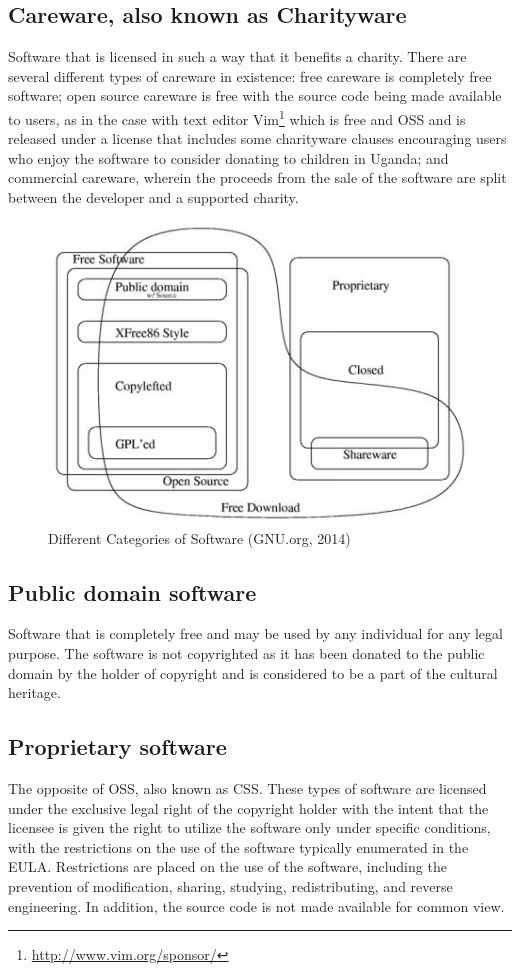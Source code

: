  \subsection*{Careware, also known as Charityware} 
Software that is licensed in such a way that it benefits a charity. There are several different types of careware in existence: free careware is completely free software; open source careware is free with the source code being made available to users, as in the case with text editor Vim\footnote{\url{http://www.vim.org/sponsor/}} which is free and OSS and is released under a license that includes some charityware clauses encouraging users who enjoy the software to consider donating to children in Uganda; and commercial careware, wherein the proceeds from the sale of the software are split between the developer and a supported charity. 
         \begin{figure}[H]
             \includegraphics[scale=0.97]{img/free-open.jpg}
           \caption{Different Categories of Software (GNU.org, 2014)}
           \label{fig:categoriesofsoftware}
         \end{figure}

    \subsection*{Public domain software}
    Software that is completely free and may be used by any individual for any legal purpose. The software is not copyrighted as it has been donated to the public domain by the holder of copyright and is considered to be a part of the cultural heritage.
    \subsection*{Proprietary software}
    The opposite of OSS, also known as \ac{CSS}. These types of software are licensed under the exclusive legal right of the copyright holder with the intent that the licensee is given the right to utilize the software only under specific conditions, with the restrictions on the use of the software typically enumerated in the  \ac{EULA}. Restrictions are placed on the use of the software, including the prevention of modification, sharing, studying, redistributing, and reverse engineering. In addition, the source code is not made available for common view.

